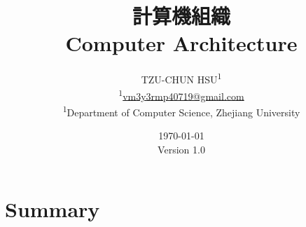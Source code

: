 \documentclass[12pt]{article}
\newcommand{\ver}{\textmd{Version} 1.0} %
\begin{document}
\title{\Huge{\textbf{計算機組織}} \\
	\LARGE{\textbf{Computer Architecture}}
}
\newcommand*{\affaddr}[1]{#1}
\newcommand*{\affmark}[1][*]{\textsuperscript{#1}}
\author{
	TZU-CHUN HSU\affmark[1] \\
	\affmark[1]\href{mailto:vm3y3rmp40719@gmail.com}{vm3y3rmp40719@gmail.com} \\
	\affaddr{\affmark[1]Department of Computer Science, Zhejiang University
	}
}

\date{\mbox{}\vfill\today\\ \ver}

\maketitle
\pagebreak



\begingroup
\section{Summary}
\begin{enumerate}
\let\clearpage\relax








\end{enumerate}
\endgroup

\end{document}
